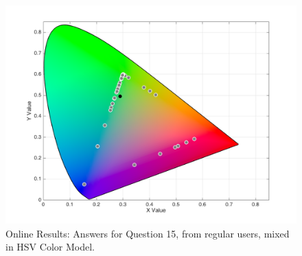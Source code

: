 \begin{figure}[htbp]
\begin{minipage}{0.48\textwidth}
    \includegraphics[width=\textwidth]{images/results/15_online_HSVresponses.png}
    \caption[Online Results: Answers for Question 15, from regular users, mixed in HSV Color Model.]{Online Results: Answers for Question 15, from regular users, mixed in HSV Color Model.}
    \label{fig:onlinehsvregular_15}
  \end{minipage}
\end{figure}
%
